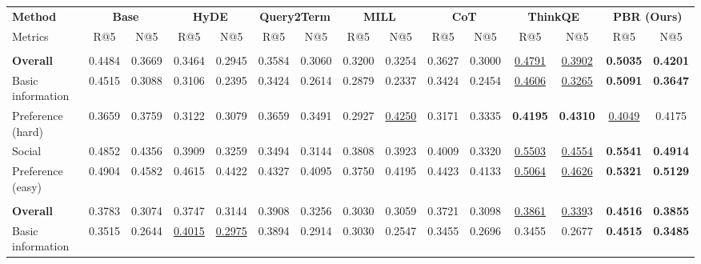 \begin{table}[t]
\centering
\small
\setlength\tabcolsep{2.75pt}  %
\renewcommand{\arraystretch}{0.80} %
\begin{tabular}{lcccccccccccccc}
\toprule
 \textbf{Method} & \multicolumn{2}{c}{\textbf{Base}} & \multicolumn{2}{c}{\textbf{HyDE}} & \multicolumn{2}{c}{\textbf{Query2Term}} & \multicolumn{2}{c}{\textbf{MILL}} & \multicolumn{2}{c}{\textbf{CoT}} & \multicolumn{2}{c}{\textbf{ThinkQE}} & \multicolumn{2}{c}{\textbf{PBR (Ours)}} \\
\cmidrule(r){2-3} \cmidrule(r){4-5} \cmidrule(r){6-7} \cmidrule(r){8-9} \cmidrule(r){10-11} \cmidrule(r){12-13} \cmidrule(r){14-15}
Metrics & R@5 & N@5 & R@5 & N@5 & R@5 & N@5 & R@5 & N@5 & R@5 & N@5 & R@5 & N@5 & R@5 & N@5 \\
\midrule
\rowcolor{gray!15}
\multicolumn{15}{c}{\textit{multi-qa-MiniLM-L6-cos-v1}} \\
\textbf{Overall} & 0.4484 & 0.3669 & 0.3464 & 0.2945 & 0.3584 & 0.3060 & 0.3200 & 0.3254 & 0.3627 & 0.3000 &\underline{0.4791}&\underline{0.3902}& \textbf{0.5035} & \textbf{0.4201} \\
Basic information & 0.4515 & 0.3088 & 0.3106 & 0.2395 & 0.3424 & 0.2614 & 0.2879 & 0.2337 & 0.3424 & 0.2454 &\underline{0.4606}&\underline{0.3265}& \textbf{0.5091} & \textbf{0.3647} \\
Preference (hard) & 0.3659 & 0.3759 & 0.3122 & 0.3079 & 0.3659 & 0.3491 & 0.2927 & \underline{0.4250} & 0.3171 & 0.3335 &\textbf{0.4195}&\textbf{0.4310}& \underline{0.4049} & 0.4175 \\
Social & 0.4852 & 0.4356 & 0.3909 & 0.3259 & 0.3494 & 0.3144 & 0.3808 & 0.3923 & 0.4009 & 0.3320 &\underline{0.5503}&\underline{0.4554}& \textbf{0.5541} & \textbf{0.4914} \\
Preference (easy) & 0.4904 & 0.4582 & 0.4615 & 0.4422 & 0.4327 & 0.4095 & 0.3750 & 0.4195 & 0.4423 & 0.4133 &\underline{0.5064}&\underline{0.4626}& \textbf{0.5321} & \textbf{0.5129} \\
\midrule
\rowcolor{gray!15}
\multicolumn{15}{c}{\textit{all-MiniLM-L6-v2}} \\
\textbf{Overall} & 0.3783 & 0.3074 & 0.3747 & 0.3144 & 0.3908 & 0.3256 & 0.3030 & 0.3059 & 0.3721 & 0.3098 &\underline{0.3861}&\underline{0.339}3& \textbf{0.4516} & \textbf{0.3855} \\
Basic information & 0.3515 & 0.2644 & \underline{0.4015} & \underline{0.2975} & 0.3894 & 0.2914 & 0.3030 & 0.2547 & 0.3455 & 0.2696 &0.3455&0.2677& \textbf{0.4515} & \textbf{0.3485} \\

\end{tabular}
\end{table}
